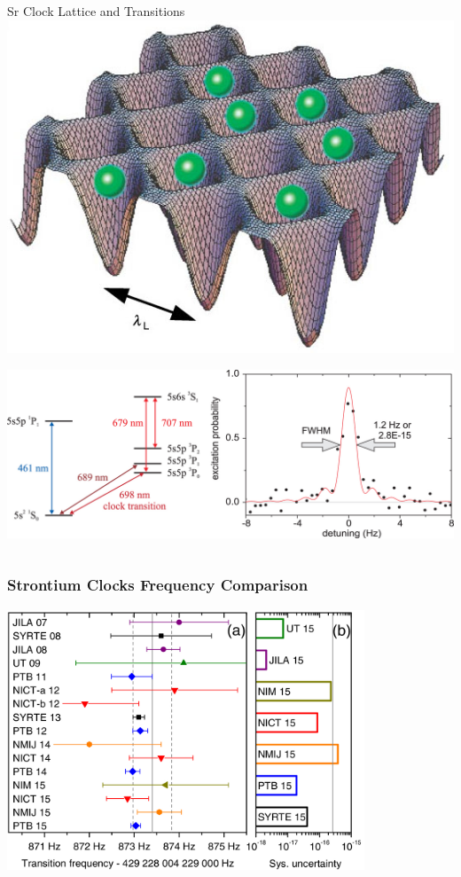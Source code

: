 \documentclass{beamer}
\begin{document}
\begin{frame}
\begin{columns}
        \begin{block}{Sr Clock Lattice and Transitions}
            \includegraphics[width=1.0\textwidth,keepaspectratio]{Images/Sr_Clock_Lattice.jpg}

            \includegraphics[width=1.0\textwidth,keepaspectratio]{Images/Sr_Trans.jpg}
        \end{block}
    \end{columns}

    \cite{Falke2014,Ushijima2015,Takamoto2005}
\end{frame}

\begin{frame}\frametitle{Strontium Clocks Frequency Comparison}
    \begin{center}
        \includegraphics[width=0.8\textwidth,keepaspectratio]{Images/Sr_Clock_Comp.jpg}
    \end{center}

    \cite{Grebing2016}
\end{frame}
\end{document}
